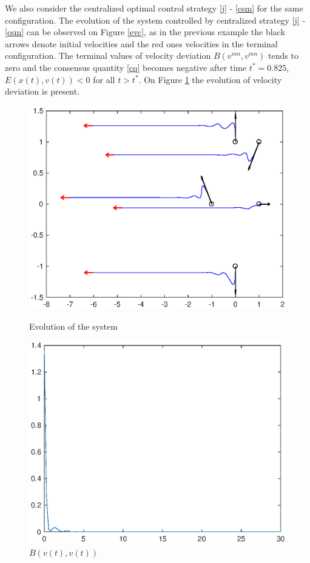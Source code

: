 \documentclass[a4paper, english]{article}
\begin{document}
We also consider the centralized optimal control strategy \eqref{j} - \eqref{csm} for the same configuration. The evolution of the system controlled by centralized strategy \eqref{j} -\eqref{csm} can be observed on Figure \ref{evc}, as in the previous example the black arrows denote initial velocities and the red ones velocities in the terminal configuration.  The terminal values
of velocity deviation $B(v^{mn}, v^{mn})$ tends to zero and the consensus quantity \eqref{cq} becomes negative after time $t^* = 0.825$,  $E(x(t), v(t)) < 0$ for all $t>t^{*}$. On Figure \ref{lfc} the evolution of velocity deviation is present.
\begin{figure}[ht]
  \begin{minipage}[b]{0.5\textwidth}
    \includegraphics[width=\textwidth]{figures/a5_C_ev.eps}
    \caption{Evolution of the system}
    \label{evc}
  \end{minipage}
  \hfill
  \begin{minipage}[b]{0.5\textwidth}
    \includegraphics[width=\textwidth]{figures/a5_C_lf.eps}
    \caption{$B(v(t), v(t))$ }
    \label{lfc}
  \end{minipage}
\end{figure}
\end{document}
